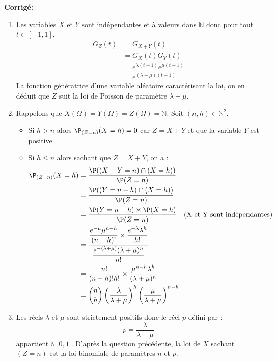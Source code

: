 \documentclass[a4paper,twoside,french,11pt]{VcCours}
\newcommand{\corr}{\textbf{Corrigé:}}
\begin{document}
\corr \begin{enumerate}
\item Les variables $X$ et $Y$ sont indépendantes et à valeurs dans $\mathbb{N}$ donc pour tout $t \in [-1,1]$,
\begin{align*}
G_Z(t) & = G_{X+Y}(t) \\
& = G_X(t) G_Y(t) \\
& = e^{\lambda (t-1)} e^{\mu (t-1)} \\
& = e^{(\lambda + \mu) (t-1)} 
\end{align*}
La fonction génératrice d'une variable aléatoire caractérisant la loi, on en déduit que $Z$ suit la loi de Poisson de paramètre $\lambda + \mu$.

\item Rappelons que $X(\Omega)= Y(\Omega) =Z(\Omega)= \mathbb{N}$. Soit $(n,h) \in \mathbb{N}^2$.
\begin{itemize}
\item Si $h>n$ alors $\P_{(Z=n)}(X=h) = 0$ car $Z=X+Y$ et que la variable $Y$ est positive.
\item Si $h \leq n$ alors sachant que $Z=X+Y$, on a :
\begin{align*}
 \P_{(Z=n)}(X=h)& = \dfrac{\P((X+Y=n) \cap (X=h))}{\P(Z=n)} \\
& = \dfrac{\P((Y=n-h) \cap (X=h))}{\P(Z=n)} \\
& = \dfrac{\P(Y=n-h) \times \P(X=h)}{\P(Z=n)}  \quad \hbox{(X et Y sont indépendantes)}\\
&= \dfrac{\dfrac{e^{-\mu}\mu^{n-h}}{(n-h)!} \times \dfrac{e^{-\lambda}\lambda^h}{h!}}{\dfrac{e^{-(\lambda+ \mu)}(\lambda+\mu)^n}{n!}} \\
& = \dfrac{n!}{(n-h)!h!} \times \dfrac{\mu^{n-h} \lambda^h}{(\lambda+\mu)^n} \\
& = \binom{n}{h} \left(\dfrac{\lambda}{\lambda+\mu}\right)^h \left(\dfrac{\mu}{\lambda+ \mu}\right)^{n-h}
\end{align*}
\end{itemize}
\item Les réels $\lambda$ et $\mu$ sont strictement positifs donc le réel $p$ défini par :
$$ p = \dfrac{\lambda}{\lambda+\mu}$$
appartient à $]0,1[$. D'après la question précédente, la loi de $X$ sachant $(Z=n)$ est la loi binomiale de paramètres $n$ et $p$.
\end{enumerate}
\end{document}
